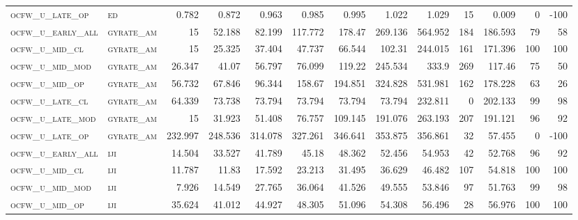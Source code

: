\begin{landscape}
\begin{center}
\begin{footnotesize}
\begin{longtable}{llrrrrrrrr|rrr}
\textsc{ocfw\_u\_late\_op  } & \textsc{ed        }   & 0.782    & 0.872    & 0.963    & 0.985    & 0.995    & 1.022    & 1.029     & 15     & 0.009         & 0             & -100            \\
\textsc{ocfw\_u\_early\_all} & \textsc{gyrate\_am}   & 15       & 52.188   & 82.199   & 117.772  & 178.47   & 269.136  & 564.952   & 184    & 186.593       & 79            & 58              \\
\textsc{ocfw\_u\_mid\_cl   } & \textsc{gyrate\_am}   & 15       & 25.325   & 37.404   & 47.737   & 66.544   & 102.31   & 244.015   & 161    & 171.396       & 100           & 100             \\
\textsc{ocfw\_u\_mid\_mod  } & \textsc{gyrate\_am}   & 26.347   & 41.07    & 56.797   & 76.099   & 119.22   & 245.534  & 333.9     & 269    & 117.46        & 75            & 50              \\
\textsc{ocfw\_u\_mid\_op   } & \textsc{gyrate\_am}   & 56.732   & 67.846   & 96.344   & 158.67   & 194.851  & 324.828  & 531.981   & 162    & 178.228       & 63            & 26              \\
\textsc{ocfw\_u\_late\_cl  } & \textsc{gyrate\_am}   & 64.339   & 73.738   & 73.794   & 73.794   & 73.794   & 73.794   & 232.811   & 0      & 202.133       & 99            & 98              \\
\textsc{ocfw\_u\_late\_mod } & \textsc{gyrate\_am}   & 15       & 31.923   & 51.408   & 76.757   & 109.145  & 191.076  & 263.193   & 207    & 191.121       & 96            & 92              \\
\textsc{ocfw\_u\_late\_op  } & \textsc{gyrate\_am}   & 232.997  & 248.536  & 314.078  & 327.261  & 346.641  & 353.875  & 356.861   & 32     & 57.455        & 0             & -100            \\
\textsc{ocfw\_u\_early\_all} & \textsc{iji       }   & 14.504   & 33.527   & 41.789   & 45.18    & 48.362   & 52.456   & 54.953    & 42     & 52.768        & 96            & 92              \\
\textsc{ocfw\_u\_mid\_cl   } & \textsc{iji       }   & 11.787   & 11.83    & 17.592   & 23.213   & 31.495   & 36.629   & 46.482    & 107    & 54.818        & 100           & 100             \\
\textsc{ocfw\_u\_mid\_mod  } & \textsc{iji       }   & 7.926    & 14.549   & 27.765   & 36.064   & 41.526   & 49.555   & 53.846    & 97     & 51.763        & 99            & 98              \\
\textsc{ocfw\_u\_mid\_op   } & \textsc{iji       }   & 35.624   & 41.012   & 44.927   & 48.305   & 51.096   & 54.308   & 56.496    & 28     & 56.976        & 100           & 100             \\

\end{longtable}
\end{footnotesize}
\end{center}
\end{landscape}
